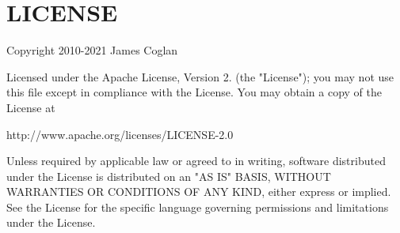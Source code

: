 \chapter{LICENSE }
\hypertarget{md__c_1_2_users_2saket_2_one_drive_2_desktop_2e_pathshala_2epathshala-_web_2node__modules_2faye-websocket_2_l_i_c_e_n_s_e}{}\label{md__c_1_2_users_2saket_2_one_drive_2_desktop_2e_pathshala_2epathshala-_web_2node__modules_2faye-websocket_2_l_i_c_e_n_s_e}
Copyright 2010-\/2021 James Coglan

Licensed under the Apache License, Version 2. (the "{}\+License"{}); you may not use this file except in compliance with the License. You may obtain a copy of the License at \begin{DoxyVerb}http://www.apache.org/licenses/LICENSE-2.0
\end{DoxyVerb}


Unless required by applicable law or agreed to in writing, software distributed under the License is distributed on an "{}\+AS IS"{} BASIS, WITHOUT WARRANTIES OR CONDITIONS OF ANY KIND, either express or implied. See the License for the specific language governing permissions and limitations under the License. 